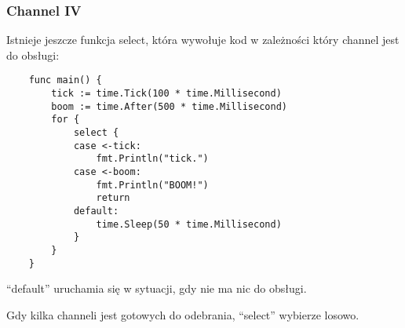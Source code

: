 \documentclass[10pt]{beamer}
\newcommand{\quotes}[1]{``#1''}
\begin{document}
\begin{frame}[fragile]
    \frametitle{Channel IV}
    Istnieje jeszcze funkcja select, która wywołuje kod w zależności który channel
    jest do obsługi:

    \begin{verbatim}
    func main() {
        tick := time.Tick(100 * time.Millisecond)
        boom := time.After(500 * time.Millisecond)
        for {
            select {
            case <-tick:
                fmt.Println("tick.")
            case <-boom:
                fmt.Println("BOOM!")
                return
            default:
                time.Sleep(50 * time.Millisecond)
            }
        }
    }
    \end{verbatim}

    \quotes{default} uruchamia się w sytuacji, gdy nie ma nic do obsługi.

    Gdy kilka channeli jest gotowych do odebrania, \quotes{select} wybierze losowo.
\end{frame}
\end{document}
